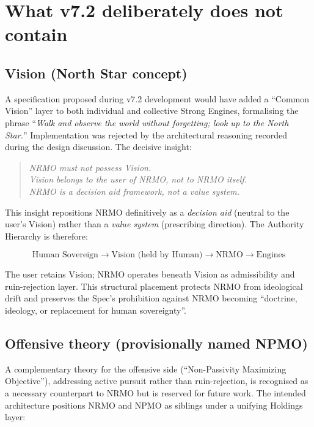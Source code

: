 \section*{What v7.2 deliberately does not contain}

\subsection*{Vision (North Star concept)}

A specification proposed during v7.2 development would have added a
``Common Vision'' layer to both individual and collective Strong
Engines, formalising the phrase
``\textit{Walk and observe the world without forgetting; look up to the North Star.}''
Implementation was rejected by the architectural reasoning recorded
during the design discussion. The decisive insight:

\begin{quote}
\itshape
NRMO must not possess Vision.\\
Vision belongs to the user of NRMO, not to NRMO itself.\\
NRMO is a decision aid framework, not a value system.
\end{quote}

This insight repositions NRMO definitively as a \emph{decision aid}
(neutral to the user's Vision) rather than a \emph{value system}
(prescribing direction). The Authority Hierarchy is therefore:

\[
\boxed{\text{Human Sovereign} \to \text{Vision (held by Human)} \to
       \text{NRMO} \to \text{Engines}}
\]

The user retains Vision; NRMO operates beneath Vision as admissibility
and ruin-rejection layer. This structural placement protects NRMO from
ideological drift and preserves the Spec's prohibition against
NRMO becoming ``doctrine, ideology, or replacement for human
sovereignty''.

\subsection*{Offensive theory (provisionally named NPMO)}

A complementary theory for the offensive side
(``Non-Passivity Maximizing Objective''), addressing active pursuit
rather than ruin-rejection, is recognised as a necessary counterpart
to NRMO but is reserved for future work. The intended architecture
positions NRMO and NPMO as siblings under a unifying Holdings layer:


